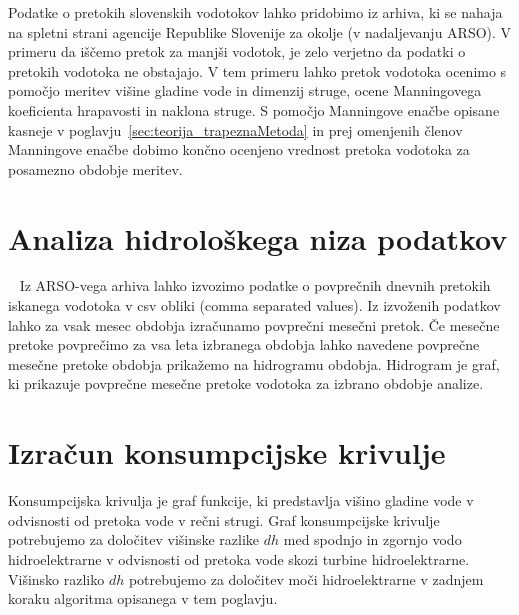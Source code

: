  
 
  Podatke o pretokih slovenskih vodotokov lahko pridobimo iz arhiva, ki se nahaja na spletni strani agencije Republike Slovenije za okolje (v nadaljevanju ARSO). V primeru da iščemo pretok za manjši vodotok, je zelo verjetno da podatki o pretokih vodotoka ne obstajajo. V tem primeru lahko pretok vodotoka ocenimo s pomočjo meritev višine gladine vode in dimenzij struge, ocene Manningovega koeficienta hrapavosti in naklona struge. S pomočjo Manningove enačbe opisane kasneje v poglavju~\ref{sec:teorija_trapeznaMetoda} in prej omenjenih členov Manningove enačbe dobimo končno ocenjeno vrednost pretoka vodotoka za posamezno obdobje meritev.




\section{Analiza hidrološkega niza podatkov}~\label{sec:teorija_hidrogramObdobja}
Iz ARSO-vega arhiva lahko izvozimo podatke o povprečnih dnevnih pretokih iskanega vodotoka v csv obliki (comma separated values). Iz izvoženih podatkov lahko za vsak mesec obdobja izračunamo povprečni mesečni pretok. Če mesečne pretoke povprečimo za vsa leta izbranega obdobja lahko navedene povprečne mesečne pretoke obdobja prikažemo na hidrogramu obdobja. Hidrogram je graf, ki prikazuje povprečne mesečne pretoke vodotoka za izbrano obdobje analize.  %




\section{Izračun konsumpcijske krivulje}
Konsumpcijska krivulja je graf funkcije, ki predstavlja višino gladine vode v odvisnosti od pretoka vode v rečni strugi. Graf konsumpcijske krivulje potrebujemo za določitev višinske razlike $dh$ med spodnjo in zgornjo vodo hidroelektrarne v odvisnosti od pretoka vode skozi turbine hidroelektrarne. Višinsko razliko $dh$ potrebujemo za določitev moči hidroelektrarne v zadnjem koraku algoritma opisanega v tem poglavju.



